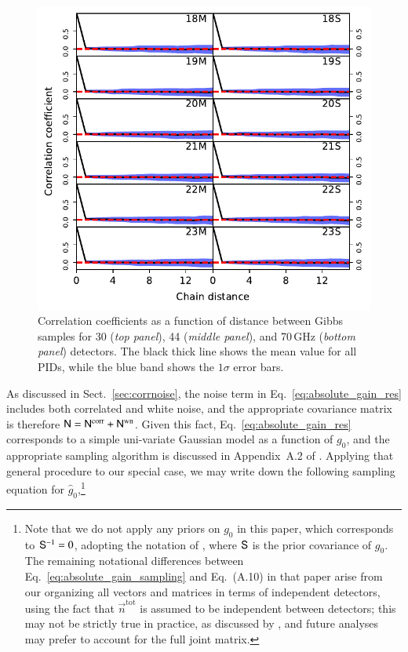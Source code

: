\documentclass[twocolumn]{aa}
\newcommand{\n}[0]{\vec{n}}
\newcommand{\N}[0]{\tens{N}}
\renewcommand{\S}[0]{\tens{S}}
\newcommand{\tot}[0]{^{\mathrm{tot}}}
\newcommand{\corr}[0]{^{\mathrm{corr}}}
\newcommand{\wn}[0]{^{\mathrm{wn}}}
\begin{document}
\begin{figure}[t]
    \includegraphics[width=0.88\linewidth]{figs/corrlengths_070.pdf}

    \caption{Correlation coefficients as a function of distance between Gibbs samples for 30 (\emph{top panel}), 44 (\emph{middle panel}), and 70\,GHz (\emph{bottom panel}) detectors. The black thick line shows the mean value for all PIDs, while the blue band shows the $1\sigma$ error bars.}
  \label{fig:corrlengths}
\end{figure}
As discussed in Sect.~\ref{sec:corrnoise}, the noise term in
Eq.~\eqref{eq:absolute_gain_res} includes both correlated and white
noise, and the appropriate covariance matrix is therefore $\N =
\N\corr + \N\wn$.  Given this fact, Eq.~\eqref{eq:absolute_gain_res}
corresponds to a simple uni-variate Gaussian model as a function of
$g_0$, and the appropriate sampling algorithm is discussed in
Appendix~A.2 of \citet{bp01}.  Applying that general procedure to our
special case, we may write down the following sampling equation for
$\hat{g}_0$,\footnote{Note that we do not apply any priors on $g_0$ in
  this paper, which corresponds to $\S^{-1}=0$, adopting the notation
  of \citet{bp01}, where $\S$ is the prior covariance of $g_0$. The
  remaining notational differences between
  Eq.~\eqref{eq:absolute_gain_sampling} and Eq.~(A.10) in that paper
  arise from our organizing all vectors and matrices in terms of
  independent detectors, using the fact that $\n\tot$ is assumed to be
  independent between detectors; this may not be strictly true in
  practice, as discussed by \citet{bp06}, and future analyses may
  prefer to account for the full joint matrix.}
\end{document}
